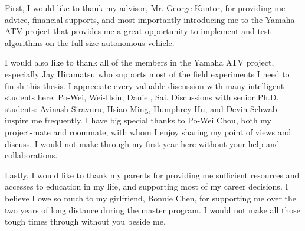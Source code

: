 \documentclass[hidelinks, 12pt]{cmuthesis}
\begin{document}
\begin{acknowledgments}

First, I would like to thank my advisor, Mr. George Kantor, for providing me advice, financial supports, and most importantly introducing me to the Yamaha ATV project that provides me a great opportunity to implement and test algorithms on the full-size autonomous vehicle.

I would also like to thank all of the members in the Yamaha ATV project, especially Jay Hiramatsu who supports most of the field experiments I need to finish this thesis. I appreciate every valuable discussion with many intelligent students here: Po-Wei, Wei-Hsin, Daniel, Sai. Discussions with senior Ph.D. students: Avinash Siravuru, Hsiao Ming, Humphrey Hu, and Devin Schwab inspire me frequently. 
I have big special thanks to Po-Wei Chou, both my project-mate and roommate, with whom I enjoy sharing my point of views and discuss. 
I would not make through my first year here without your help and collaborations.

Lastly, I would like to thank my parents for providing me sufficient resources and accesses to education in my life, and supporting most of my career decisions. I believe I owe so much to my girlfriend, Bonnie Chen, for supporting me over the two years of long distance during the master program. I would not make all those tough times through without you beside me.

  
\end{acknowledgments}



\tableofcontents
\listoffigures
\listoftables

\mainmatter


%
%
%
%
%
\end{document}
